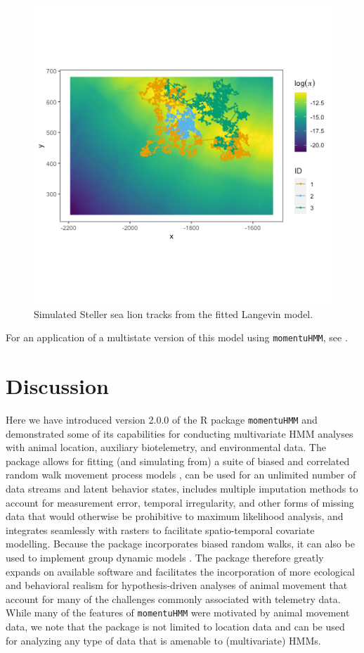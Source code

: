 \documentclass[12pt]{article}\usepackage[]{graphicx}\usepackage[]{xcolor}
\begin{document}
\begin{figure}
\center
\includegraphics[width=1\textwidth]{plot_simLangevin.png}
\caption{Simulated Steller sea lion tracks from the fitted Langevin model.}
\end{figure}
\noindent For an application of a multistate version of this model using \verb|momentuHMM|, see \citet{McClintockLander2022}.

\section{Discussion}
Here we have introduced version 2.0.0 of the R package \verb|momentuHMM| and demonstrated some of its capabilities for conducting multivariate HMM analyses with animal location, auxiliary biotelemetry, and environmental data. The package allows for fitting (and simulating from) a suite of biased and correlated random walk movement process models \citep[e.g.][]{McClintockEtAl2012}, can be used for an unlimited number of data streams and latent behavior states, includes multiple imputation methods to account for measurement error, temporal irregularity, and other forms of missing data that would otherwise be prohibitive to maximum likelihood analysis, and integrates seamlessly with rasters to facilitate spatio-temporal covariate modelling. Because the package incorporates biased random walks, it can also be used to implement group dynamic models \cite[e.g.][]{LangrockEtAl2014}. The package therefore greatly expands on available software and facilitates the incorporation of more ecological and behavioral realism for hypothesis-driven analyses of animal movement that account for many of the challenges commonly associated with telemetry data. While many of the features of \verb|momentuHMM| were motivated by animal movement data, we note that the package is not limited to location data and can be used for analyzing any type of data that is amenable to (multivariate) HMMs.
\end{document}
